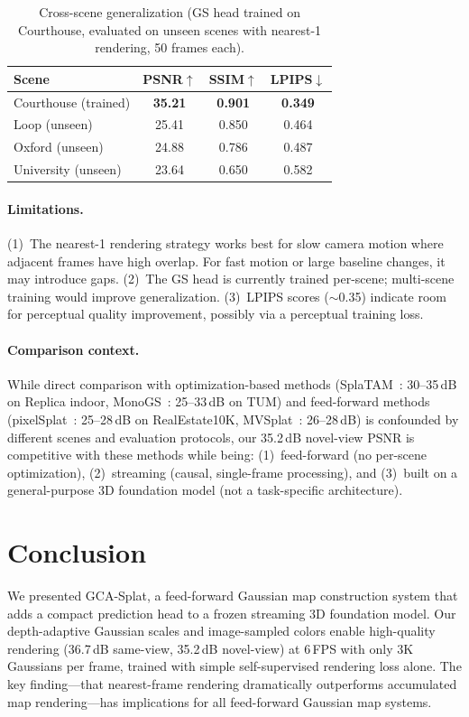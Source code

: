 \documentclass[10pt,twocolumn]{article}
\begin{document}
\begin{table}[t]
  \centering
  \caption{Cross-scene generalization (GS head trained on Courthouse, evaluated on unseen scenes with nearest-1 rendering, 50 frames each).}
  \label{tab:cross_scene}
  \begin{tabular}{l|ccc}
    \toprule
    Scene & PSNR$\uparrow$ & SSIM$\uparrow$ & LPIPS$\downarrow$ \\
    \midrule
    Courthouse (trained) & \textbf{35.21} & \textbf{0.901} & \textbf{0.349} \\
    Loop (unseen) & 25.41 & 0.850 & 0.464 \\
    Oxford (unseen) & 24.88 & 0.786 & 0.487 \\
    University (unseen) & 23.64 & 0.650 & 0.582 \\
    \bottomrule
  \end{tabular}
\end{table}

\paragraph{Limitations.}
(1)~The nearest-1 rendering strategy works best for slow camera motion where adjacent frames have high overlap.
For fast motion or large baseline changes, it may introduce gaps.
(2)~The GS head is currently trained per-scene; multi-scene training would improve generalization.
(3)~LPIPS scores (${\sim}$0.35) indicate room for perceptual quality improvement, possibly via a perceptual training loss.

\paragraph{Comparison context.}
While direct comparison with optimization-based methods (SplaTAM~\cite{splatam}: 30--35\,dB on Replica indoor, MonoGS~\cite{monogs}: 25--33\,dB on TUM) and feed-forward methods (pixelSplat~\cite{pixelsplat}: 25--28\,dB on RealEstate10K, MVSplat~\cite{mvsplat}: 26--28\,dB) is confounded by different scenes and evaluation protocols, our 35.2\,dB novel-view PSNR is competitive with these methods while being:
(1)~feed-forward (no per-scene optimization),
(2)~streaming (causal, single-frame processing), and
(3)~built on a general-purpose 3D foundation model (not a task-specific architecture).

\section{Conclusion}

We presented GCA-Splat, a feed-forward Gaussian map construction system that adds a compact prediction head to a frozen streaming 3D foundation model.
Our depth-adaptive Gaussian scales and image-sampled colors enable high-quality rendering (36.7\,dB same-view, 35.2\,dB novel-view) at 6\,FPS with only 3K Gaussians per frame, trained with simple self-supervised rendering loss alone.
The key finding---that nearest-frame rendering dramatically outperforms accumulated map rendering---has implications for all feed-forward Gaussian map systems.



\end{document}
